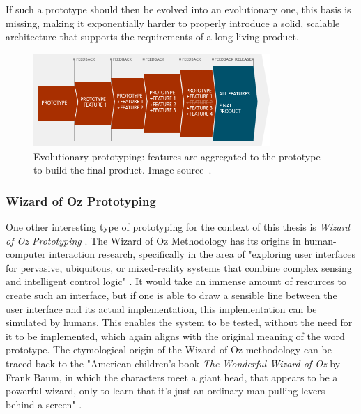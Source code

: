 If such a prototype should then be evolved into an evolutionary one, this basis is missing, making it exponentially harder to properly introduce a solid, scalable architecture that supports the requirements of a long-living product.
%
\begin{figure}
    \centering
    \includegraphics[width=0.8\textwidth]{images/evolutionary-prototyping}
    \caption{Evolutionary prototyping: features are aggregated to the prototype to build the final product. Image source~\cite{mourzenko_why_2014}.}
    \label{fig:evolutionary-prototyping}
\end{figure}

\subsubsection{Wizard of Oz Prototyping}
\label{subsub:wizard-of-oz-prototyping}
One other interesting type of prototyping for the context of this thesis is \emph{Wizard of Oz Prototyping} \cite{dow_wizard_2005}.
The Wizard of Oz Methodology has its origins in human-computer interaction research, specifically in the area of "exploring user interfaces for pervasive, ubiquitous,
or mixed-reality systems that combine complex sensing and intelligent control logic" \cite{dow_wizard_2005}.
It would take an immense amount of resources to create such an interface, but if one is able to draw a sensible line between the user interface and its actual implementation, this implementation can be simulated by humans.
This enables the system to be tested, without the need for it to be implemented, which again aligns with the original meaning of the word prototype.
The etymological origin of the Wizard of Oz methodology can be traced back to the "American children's book \emph{The Wonderful Wizard of Oz} by Frank Baum, in which the characters meet a giant head, that appears to be a powerful wizard, only to learn that it’s just an ordinary man pulling levers behind a screen" \cite{ramaswamy_wizard_2022}.



